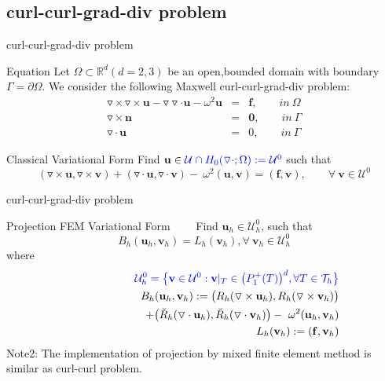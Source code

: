 \documentclass[13pt]{beamer}
\begin{document}
\subsection{curl-curl-grad-div problem}
\begin{frame}[t]{curl-curl-grad-div problem}
  \begin{block}{Equation}
   Let $\Omega\subset\mathbb{R}^d (d=2,3)$ be an open,bounded domain with boundary $\Gamma=\partial\Omega.$
We consider the following Maxwell curl-curl-grad-div problem:
  \begin{eqnarray}
     \triangledown\times\triangledown\times \textbf{u} - \triangledown\triangledown\cdot\mathbf{u} - \omega^2\mathbf{u} & = & \mathbf{f}, \qquad  in\ \Omega \\
     \triangledown\times\mathbf{n} & = & \mathbf{0}, \qquad in\ \Gamma\\
     \triangledown\cdot\mathbf{u}  & = & 0, \qquad in \ \Gamma
  \end{eqnarray}
  \end{block}
  \begin{block}{Classical Variational Form}
    Find $\mathbf{u}\in{\color{blue}\mathcal{U}\cap H_0(\triangledown\cdot;\Omega):= \mathcal{U}^{0}}$ such that
    \[(\triangledown\times\mathbf{u},\triangledown\times\mathbf{v}) + (\triangledown\cdot\mathbf{u},\triangledown\cdot\mathbf{v}) - \
    \omega^2(\mathbf{u},\mathbf{v}) = (\mathbf{f},\mathbf{v}), \qquad \forall\ \mathbf{v}\in\mathcal{U}^{0}\]
  \end{block}
\end{frame}

\begin{frame}[t]{curl-curl-grad-div problem}
   \begin{block}{Projection FEM Variational Form}
     $\qquad$Find $\mathbf{u}_h\in\mathcal{U}^{0}_{h}$, such that {\color{red}\[B_h(\mathbf{u}_h,\mathbf{v}_h) = L_h(\mathbf{v}_h), \forall\ \mathbf{v}_h\in\mathcal{U}^{0}_{h}\] }
     where
     \begin{eqnarray}
         \nonumber
         &&{\color{blue}\mathcal{U}_h^0 = \big\{\mathbf{v}\in \mathcal{U}^0: \mathbf{v}|_T\in\big(P_{1}^{+}(T)\big)^d, \forall T\in \mathcal{T}_h\big\}} \\ \nonumber
         &&B_h(\mathbf{u}_h,\mathbf{v}_h) := \big(R_h(\triangledown\times\mathbf{u}_h),R_h(\triangledown\times\mathbf{v}_h)\big) \\ \nonumber
         &&\qquad\qquad\qquad + \big(\breve{R}_h(\triangledown\cdot\mathbf{u}_h),\breve{R}_h(\triangledown\cdot\mathbf{v}_h)\big) - \
         \omega^2(\mathbf{u}_h,\mathbf{v}_h)  \\ \nonumber
         &&L_h(\mathbf{v}_h) := (\mathbf{f},\mathbf{v}_h)
     \end{eqnarray}
     Note2: The implementation of projection by mixed finite element method is similar as curl-curl problem.
   \end{block}
\end{frame}
\end{document}
